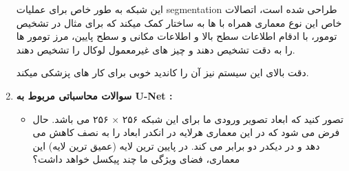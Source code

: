 \begin{enumerate}
{\begin{itemize}
{		            \begin{qsolve}[]
			            این شبکه به طور خاص برای عملیات segmentation طراحی شده است، اتصالات خاص این نوع معماری همراه با  ها
			            به ساختار کمک میکند که برای مثال در تشخیص تومور، با ادقام اطلاعات سطح بالا و اطلاعات مکانی و سطح
			            پایین، مرز تومور ها را به دقت تشخیص دهند و چیز های غیرمعمول لوکال را تشخیص دهند.

			            دقت بالای این سیستم نیز آن را کاندید خوبی برای کار های پزشکی میکند.
		            \end{qsolve}
		            }
	      \end{itemize}
	      }
	      \clearpage
	\item {
	      \textbf{سوالات محاسباتی مربوط به U-Net :}
	      \begin{itemize}
		      \item {
		            تصور کنید که ابعاد تصویر ورودی ما برای این شبکه ۲۵۶ × ۲۵۶ می باشد. حال فرض می شود که در
		            این معماری هرلایه در انکدر ابعاد را به نصف کاهش می دهد و در دیکدر دو برابر می کند. در پایین ترین
		            لایه (عمیق ترین لایه) این معماری، فضای ویژگی ما چند پیکسل خواهد داشت؟

}
\end{itemize}}
\end{enumerate}
